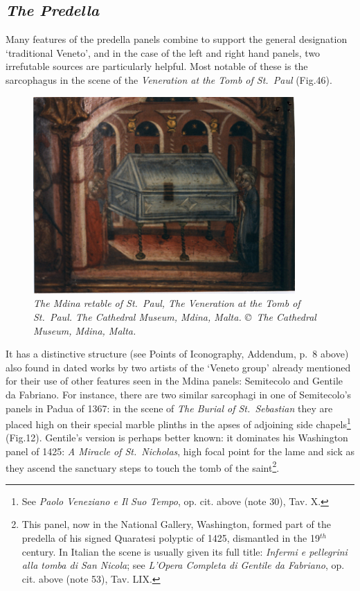\documentclass[a4paper,12pt]{article}
\begin{document}
\subsection{\textit{The Predella}}

Many features of the predella panels combine to support the general
designation `traditional Veneto', and in the case of the left and
right hand panels, two irrefutable sources are particularly helpful.
Most notable of these is the sarcophagus in the scene of the
\textit{Veneration at the Tomb of St.~Paul} (Fig.46). 
\begin{figure}[htbp]
\centering
\includegraphics[width=10cm]{pics/fig46.png}
\caption[The Mdina retable of St.~Paul, The Veneration at the Tomb of
  St.~Paul]  
{\it The Mdina retable of St.~Paul, The Veneration at the Tomb of St.~Paul.
The Cathedral Museum, Mdina, Malta. \copyright\ The Cathedral Museum,
  Mdina, Malta.} 
\end{figure}
It has a distinctive structure (see Points of Iconography, Addendum,
p.~8 above) also found
in dated works by two artists of the `Veneto
group' already mentioned 
for their use of other features seen
%
in the Mdina panels: Semitecolo and Gentile da Fabriano. For instance,
there are two similar sarcophagi in one of Semitecolo's panels in
Padua of 1367: in the scene of \textit{The Burial of St.~Sebastian}
they are placed high on their special marble plinths in the apses of
adjoining side chapels\footnote{See \textit{Paolo Veneziano e Il Suo
    Tempo}, op. cit. above (note 30), Tav. X.} (Fig.12).  Gentile's
version is perhaps better known: it dominates his Washington panel of
1425: \textit{A Miracle of St.~Nicholas}, high focal point for the
lame and sick as they ascend the sanctuary steps to touch the tomb of
the saint\footnote{This panel, now in the National Gallery,
  Washington, formed part of the predella of his signed Quaratesi
  polyptic of 1425, dismantled in the 19$^{th}$ century. In Italian
  the scene is usually given its full title: \textit{Infermi e
    pellegrini alla tomba di San Nicola}; see \textit{L'Opera Completa
    di Gentile da Fabriano}, op. cit. above (note 53), Tav. LIX.}.
\end{document}
